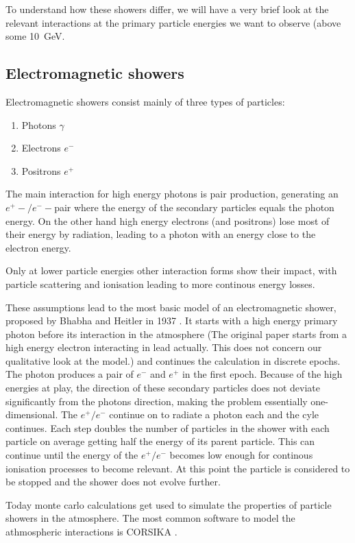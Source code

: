 To understand how these showers differ, we will have a very brief look
at the relevant interactions at the primary particle energies
we want to observe (above some  \SI{10}{\giga\electronvolt}.

\subsection{Electromagnetic showers}
Electromagnetic showers consist mainly of three types of particles:
\begin{enumerate}
	\item{Photons $\gamma$}
	\item{Electrons $e^-$}
	\item{Positrons $e^+$}
\end{enumerate}

The main interaction for high energy photons is pair 
production, generating an $e^+-/e^--$pair where the energy of 
the secondary particles equals the photon energy.
On the other hand high energy electrons (and positrons) lose 
most of their energy by radiation, leading to a photon with 
an energy close to the electron energy.

Only at lower particle energies other interaction forms show their impact,
with particle scattering and ionisation 
leading to more continous energy losses.

These assumptions lead to the most basic model of an 
electromagnetic shower, proposed by Bhabha and Heitler in 1937
\cite{doi:10.1098/rspa.1937.0082}.
It starts with a high energy primary photon before its interaction in the atmosphere 
(The original paper starts from a high energy electron interacting in lead actually.
This does not concern our qualitative look at the model.) and continues 
the calculation in discrete epochs.
The photon produces a pair of $e^-$ and $e^+$ in the first epoch.
Because of the high energies at play, the direction of these secondary 
particles does not deviate significantly from the photons direction, 
making the problem essentially one-dimensional.
The $e^+/e^-$ continue on to radiate a photon each and the cyle continues.
Each step doubles the number of particles in the shower with each particle 
on average getting half the energy of its parent particle.
This can continue until the energy of the $e^+/e^-$ becomes low enough for
continous ionisation processes to become relevant.
At this point the particle is considered to be stopped and the shower
does not evolve further.

Today monte carlo calculations get used to simulate the properties 
of particle showers in the atmosphere.
The most common software to model the athmospheric interactions is
CORSIKA \cite{Engel:2018akg}.

